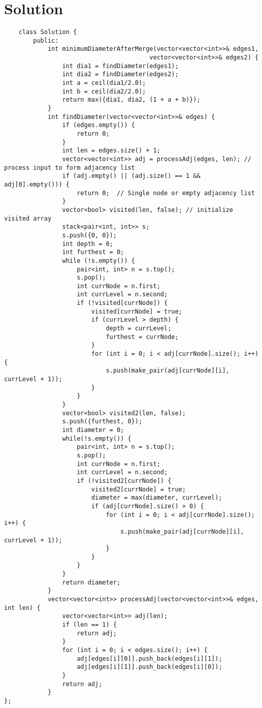 \documentclass{article}
\begin{document}
\section*{Solution}
\begin{lstlisting}
    class Solution {
        public:
            int minimumDiameterAfterMerge(vector<vector<int>>& edges1,
                                        vector<vector<int>>& edges2) {
                int dia1 = findDiameter(edges1);
                int dia2 = findDiameter(edges2);
                int a = ceil(dia1/2.0);
                int b = ceil(dia2/2.0);
                return max({dia1, dia2, (1 + a + b)});
            }
            int findDiameter(vector<vector<int>>& edges) {
                if (edges.empty()) {
                    return 0;
                }
                int len = edges.size() + 1;
                vector<vector<int>> adj = processAdj(edges, len); // process input to form adjacency list
                if (adj.empty() || (adj.size() == 1 && adj[0].empty())) {
                    return 0;  // Single node or empty adjacency list
                }
                vector<bool> visited(len, false); // initialize visited array
                stack<pair<int, int>> s;
                s.push({0, 0});
                int depth = 0;
                int furthest = 0;
                while (!s.empty()) {
                    pair<int, int> n = s.top();
                    s.pop();
                    int currNode = n.first;
                    int currLevel = n.second;
                    if (!visited[currNode]) {
                        visited[currNode] = true;
                        if (currLevel > depth) {
                            depth = currLevel;
                            furthest = currNode;
                        }
                        for (int i = 0; i < adj[currNode].size(); i++) {
                            s.push(make_pair(adj[currNode][i], currLevel + 1));
                        }
                    }
                }
                vector<bool> visited2(len, false);
                s.push({furthest, 0});
                int diameter = 0;
                while(!s.empty()) {
                    pair<int, int> n = s.top();
                    s.pop();
                    int currNode = n.first;
                    int currLevel = n.second;
                    if (!visited2[currNode]) {
                        visited2[currNode] = true;
                        diameter = max(diameter, currLevel);
                        if (adj[currNode].size() > 0) {
                            for (int i = 0; i < adj[currNode].size(); i++) {
                                s.push(make_pair(adj[currNode][i], currLevel + 1));
                            }
                        }
                    }
                }
                return diameter;
            }
            vector<vector<int>> processAdj(vector<vector<int>>& edges, int len) {
                vector<vector<int>> adj(len);
                if (len == 1) {
                    return adj;
                }
                for (int i = 0; i < edges.size(); i++) {
                    adj[edges[i][0]].push_back(edges[i][1]);
                    adj[edges[i][1]].push_back(edges[i][0]);
                }
                return adj;
            }
};
\end{lstlisting}
\end{document}
